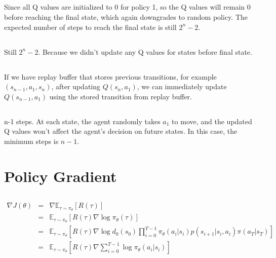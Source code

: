 \documentclass[12pt]{article}
\begin{document}
\subsection{}
Since all Q values are initialized to 0 for policy 1, so the Q values will remain 0 before reaching the final state, which again downgrades to random policy. The expected number of steps to reach the final state is still $2^n - 2$.

\subsection{}
Still $2^n - 2$. Because we didn't update any Q values for states before final state.

\subsection{}
If we have replay buffer that stores previous transitions, for example $(s_{n-1}, a_1, s_{n})$, after updating $Q(s_n, a_1)$, we can immediately update $Q(s_{n-1}, a_1)$ using the stored transition from replay buffer. 

\subsection{}
n-1 steps. At each state, the agent randomly takes $a_1$ to move, and the updated Q values won't affect the agent's decision on future states. In this case, the minimum steps is $n-1$.
\newpage

\section{Policy Gradient}
\subsection{}
\begin{eqnarray}
    \nabla J(\theta) &=& \nabla \mathbb{E}_{\tau \sim \pi_{\theta}} [R(\tau)] \nonumber \\
    &=& \mathbb{E} _{\tau \sim \pi_{\theta}}[R(\tau) \nabla \log \pi_{\theta}(\tau)] \nonumber \\
    &=& \mathbb{E} _{\tau \sim \pi_{\theta}} [R(\tau) \nabla \log d_0(s_0) \prod_{i=0}^{T-1} \pi_{\theta}(a_i | s_i) p(s_{i+1} | s_i, a_i) \pi(a_T | s_T) ] \nonumber \\
    &=& \mathbb{E} _{\tau \sim \pi_{\theta}} [ R(\tau) \nabla \sum_{i=0}^{T-1} \log \pi_{\theta}(a_i | s_i)] \nonumber
\end{eqnarray}
\end{document}

